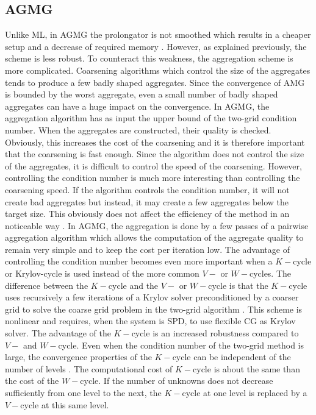 \subsection{AGMG}
Unlike ML, in AGMG the prolongator is not smoothed which results in a
cheaper setup and a decrease of required memory \cite{agmg2}. However, as
explained previously, the scheme is less robust. To counteract this weakness, the
aggregation scheme is more complicated. Coarsening algorithms which control
the size of the aggregates tends to produce a few badly shaped aggregates.
Since the convergence of AMG is bounded by the worst aggregate, even a small 
number of badly shaped aggregates can have a huge impact on
the convergence. In AGMG, the aggregation algorithm has as input the upper
bound of the two-grid condition number. When the aggregates are constructed,
their quality is checked. Obviously, this increases the cost of the coarsening
and it is therefore important that the coarsening is fast enough. Since the 
algorithm does not control the size of the aggregates, it is difficult to 
control the speed of the coarsening. However, controlling the condition number
is much more interesting than controlling the coarsening speed. If the algorithm 
controls the condition number, it will not create bad aggregates but instead, it 
may create a few aggregates below the target size. This obviously 
does not affect the efficiency of the method in an noticeable way \cite{agmg2}. 
In AGMG, the aggregation is done by a few passes of a pairwise aggregation 
algorithm which allows the computation of the aggregate quality to remain very 
simple and to keep the cost per iteration low. The advantage of controlling the 
condition number becomes even more important when a $K-$cycle or Krylov-cycle is 
used instead of the more common $V-$ or $W-$cycles. The difference between the 
$K-$cycle and the $V-$ or $W-$cycle is that the $K-$cycle uses recursively a 
few iterations of a Krylov solver preconditioned by a coarser grid to solve 
the coarse grid problem in the two-grid algorithm \cite{k_cycle}. This scheme 
is nonlinear and requires, when the system is SPD, to use flexible CG 
\cite{fcg,fcg_2,fcg_3,fcg_4} as Krylov solver. The advantage of the $K-$cycle is 
an increased robustness compared to $V-$ and $W-$cycle. Even when the condition 
number of the two-grid method is large, the convergence properties of the 
$K-$cycle can be independent of the number of levels \cite{k_cycle}. The 
computational cost of $K-$cycle is about the same than the cost of the 
$W-$cycle. If the number of unknowns does not decrease sufficiently from one 
level to the next, the $K-$cycle at one level is replaced by a $V-$cycle at 
this same level.
